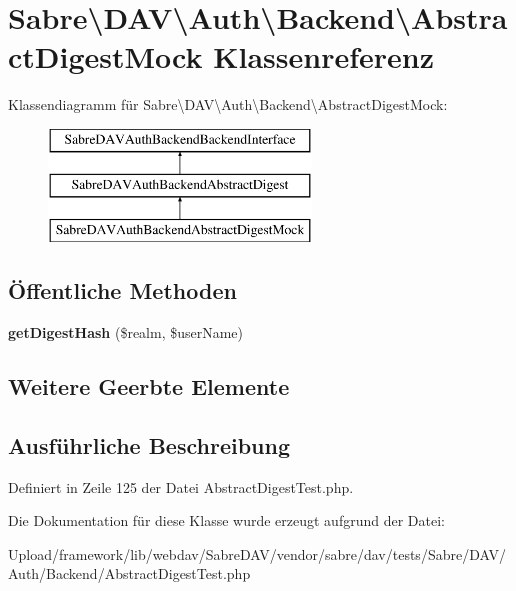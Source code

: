 \hypertarget{class_sabre_1_1_d_a_v_1_1_auth_1_1_backend_1_1_abstract_digest_mock}{}\section{Sabre\textbackslash{}D\+AV\textbackslash{}Auth\textbackslash{}Backend\textbackslash{}Abstract\+Digest\+Mock Klassenreferenz}
\label{class_sabre_1_1_d_a_v_1_1_auth_1_1_backend_1_1_abstract_digest_mock}
Klassendiagramm für Sabre\textbackslash{}D\+AV\textbackslash{}Auth\textbackslash{}Backend\textbackslash{}Abstract\+Digest\+Mock\+:\begin{figure}[H]
\begin{center}
\leavevmode
\includegraphics[height=3.000000cm]{class_sabre_1_1_d_a_v_1_1_auth_1_1_backend_1_1_abstract_digest_mock}
\end{center}
\end{figure}
\subsection*{Öffentliche Methoden}
\begin{DoxyCompactItemize}
\item 
\mbox{\label{class_sabre_1_1_d_a_v_1_1_auth_1_1_backend_1_1_abstract_digest_mock_a04e0870d56b484dfb1c9bac1196d696d}} 
{\bfseries get\+Digest\+Hash} (\$realm, \$user\+Name)
\end{DoxyCompactItemize}
\subsection*{Weitere Geerbte Elemente}


\subsection{Ausführliche Beschreibung}


Definiert in Zeile 125 der Datei Abstract\+Digest\+Test.\+php.



Die Dokumentation für diese Klasse wurde erzeugt aufgrund der Datei\+:\begin{DoxyCompactItemize}
\item 
Upload/framework/lib/webdav/\+Sabre\+D\+A\+V/vendor/sabre/dav/tests/\+Sabre/\+D\+A\+V/\+Auth/\+Backend/Abstract\+Digest\+Test.\+php\end{DoxyCompactItemize}
